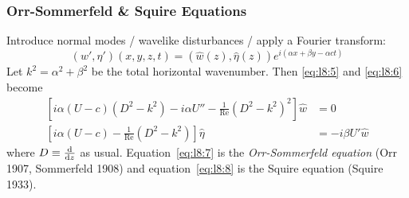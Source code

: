 \documentclass{jknotes}
\newcommand{\ReN}{\text{Re}}
\begin{document}
\subsubsection{Orr-Sommerfeld \& Squire Equations}
Introduce normal modes / wavelike disturbances / apply a Fourier transform:
\begin{equation}
	(w', \eta')(x,y,z,t) = (\hat{w}(z), \hat{\eta}(z)) e^{i(\alpha x+ \beta y
	- \alpha c t)}
\end{equation}
Let $k^2 = \alpha^2 + \beta^2$ be the total horizontal wavenumber. Then
\eqref{eq:l8:5} and \eqref{eq:l8:6} become
\begin{align}
	\left[ i\alpha (U-c)(D^2 -k^2) - i\alpha U'' -
	\frac{1}{\ReN}(D^2-k^2)^2\right]\hat{w} &= 0 \label{eq:l8:7} \\
	\left[ i\alpha (U-c) - \frac{1}{\ReN} (D^2 - k^2)\right] \hat{\eta} &=
	-i\beta U' \hat{w} \label{eq:l8:8}
\end{align}
where $D \equiv \frac{\diffd}{\diffd z}$ as usual. Equation~\eqref{eq:l8:7}
is the \emph{Orr-Sommerfeld equation} (Orr 1907, Sommerfeld 1908) and
equation~\eqref{eq:l8:8} is the Squire equation (Squire 1933).
\end{document}
